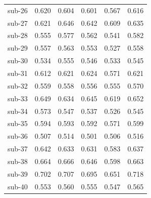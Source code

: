 \begin{table}[t]
\begin{tabular}{lccccc}
sub-26 & 0.620 & 0.604 & 0.601 & 0.567 & 0.616 \\
sub-27 & 0.621 & 0.646 & 0.642 & 0.609 & 0.635 \\
sub-28 & 0.555 & 0.577 & 0.562 & 0.541 & 0.582 \\
sub-29 & 0.557 & 0.563 & 0.553 & 0.527 & 0.558 \\
sub-30 & 0.534 & 0.555 & 0.546 & 0.533 & 0.545 \\
sub-31 & 0.612 & 0.621 & 0.624 & 0.571 & 0.621 \\
sub-32 & 0.559 & 0.558 & 0.556 & 0.555 & 0.570 \\
sub-33 & 0.649 & 0.634 & 0.645 & 0.619 & 0.652 \\
sub-34 & 0.573 & 0.547 & 0.537 & 0.526 & 0.545 \\
sub-35 & 0.594 & 0.593 & 0.592 & 0.571 & 0.599 \\
sub-36 & 0.507 & 0.514 & 0.501 & 0.506 & 0.516 \\
sub-37 & 0.642 & 0.633 & 0.631 & 0.583 & 0.637 \\
sub-38 & 0.664 & 0.666 & 0.646 & 0.598 & 0.663 \\
sub-39 & 0.702 & 0.707 & 0.695 & 0.651 & 0.718 \\
sub-40 & 0.553 & 0.560 & 0.555 & 0.547 & 0.565 \\
\bottomrule
\end{tabular}
\end{table}

